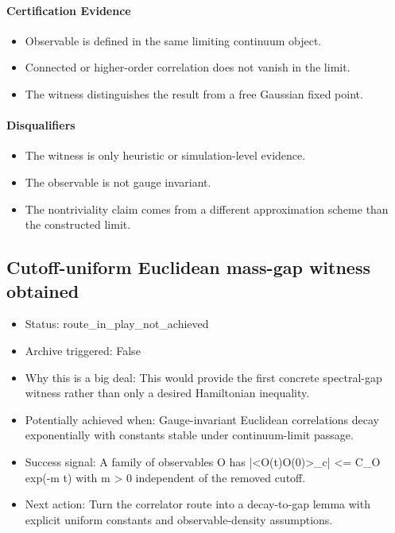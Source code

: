 \documentclass[11pt]{article}
\begin{document}
\paragraph{Certification Evidence}

\begin{itemize}
\item Observable is defined in the same limiting continuum object.
\item Connected or higher-order correlation does not vanish in the limit.
\item The witness distinguishes the result from a free Gaussian fixed point.
\end{itemize}

\paragraph{Disqualifiers}

\begin{itemize}
\item The witness is only heuristic or simulation-level evidence.
\item The observable is not gauge invariant.
\item The nontriviality claim comes from a different approximation scheme than the constructed limit.
\end{itemize}

\subsection*{Cutoff-uniform Euclidean mass-gap witness obtained}

\begin{itemize}
\item Status: route\_in\_play\_not\_achieved
\item Archive triggered: False
\item Why this is a big deal: This would provide the first concrete spectral-gap witness rather than only a desired Hamiltonian inequality.
\item Potentially achieved when: Gauge-invariant Euclidean correlations decay exponentially with constants stable under continuum-limit passage.
\item Success signal: A family of observables O has |<O(t)O(0)>\_c| <= C\_O exp(-m t) with m > 0 independent of the removed cutoff.
\item Next action: Turn the correlator route into a decay-to-gap lemma with explicit uniform constants and observable-density assumptions.
\end{itemize}
\end{document}
